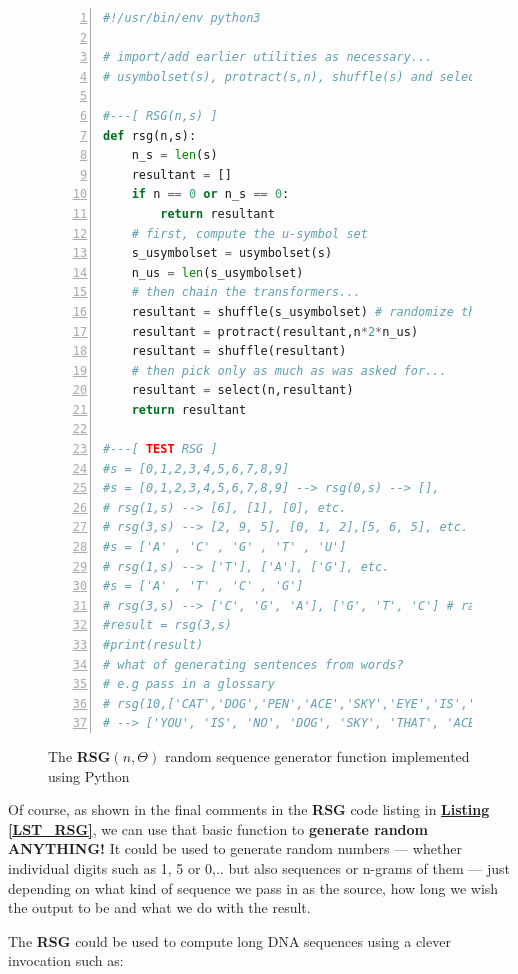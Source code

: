 \documentclass[a4paper, 18pt]{book} %
\begin{document}
\begin{figure}[H]
  \begin{center}
  \begin{lstlisting}[caption={The RSG}, label={LST_RSG}, language=Python, frame=single, numbers=left, basicstyle=\ttfamily,  commentstyle=\color{blue}]
#!/usr/bin/env python3

# import/add earlier utilities as necessary...
# usymbolset(s), protract(s,n), shuffle(s) and select(n,s)

#---[ RSG(n,s) ]
def rsg(n,s):
    n_s = len(s)
    resultant = []
    if n == 0 or n_s == 0:
        return resultant
    # first, compute the u-symbol set
    s_usymbolset = usymbolset(s)
    n_us = len(s_usymbolset)
    # then chain the transformers...
    resultant = shuffle(s_usymbolset) # randomize the symbol set
    resultant = protract(resultant,n*2*n_us)
    resultant = shuffle(resultant)
    # then pick only as much as was asked for...
    resultant = select(n,resultant)
    return resultant

#---[ TEST RSG ]
#s = [0,1,2,3,4,5,6,7,8,9]
#s = [0,1,2,3,4,5,6,7,8,9] --> rsg(0,s) --> [],
# rsg(1,s) --> [6], [1], [0], etc.
# rsg(3,s) --> [2, 9, 5], [0, 1, 2],[5, 6, 5], etc.
#s = ['A' , 'C' , 'G' , 'T' , 'U']
# rsg(1,s) --> ['T'], ['A'], ['G'], etc.
#s = ['A' , 'T' , 'C' , 'G']
# rsg(3,s) --> ['C', 'G', 'A'], ['G', 'T', 'C'] # random DNA codons!
#result = rsg(3,s)
#print(result)
# what of generating sentences from words?
# e.g pass in a glossary
# rsg(10,['CAT','DOG','PEN','ACE','SKY','EYE','IS','THAT','NO','YOU']) 
# --> ['YOU', 'IS', 'NO', 'DOG', 'SKY', 'THAT', 'ACE', 'EYE', 'CAT', 'PEN']
\end{lstlisting}
  \end{center}
  \caption{The \textbf{RSG}$(n,\Theta)$ random sequence generator function implemented using Python}
\end{figure}

Of course, as shown in the final comments in the \textbf{RSG} code listing in \textbf{\hyperref[LST_RSG]{Listing \ref{LST_RSG}}}, we can use that basic function to \textbf{generate random ANYTHING!} It could be used to generate random numbers --- whether individual digits such as 1, 5 or 0,.. but also sequences or n-grams of them --- just depending on what kind of sequence we pass in as the source, how long we wish the output to be and what we do with the result. 

The \textbf{RSG} could be used to compute long DNA sequences using a clever invocation such as:\\
\end{document}
